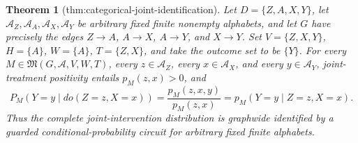 \documentclass{article}
\newtheorem{theorem}{Theorem}
\begin{document}
\begin{theorem}[thm:categorical-joint-identification]\label{thm:categorical-joint-identification}
Let \(D=\{Z,A,X,Y\}\), let \(\mathcal A_Z,\mathcal A_A,\mathcal A_X,\mathcal A_Y\) be arbitrary fixed finite nonempty alphabets, and let \(G\) have precisely the edges \(Z\to A\), \(A\to X\), \(A\to Y\), and \(X\to Y\).  Set \(V=\{Z,X,Y\}\), \(H=\{A\}\), \(W=\{A\}\), \(T=\{Z,X\}\), and take the outcome set to be \(\{Y\}\).  For every \(M\in\mathfrak M(G,\mathcal A,V,W,T)\), every \(z\in\mathcal A_Z\), every \(x\in\mathcal A_X\), and every \(y\in\mathcal A_Y\), joint-treatment positivity entails \(p_M(z,x)>0\), and
\[
 P_M(Y=y\mid do(Z=z,X=x))
 =\frac{p_M(z,x,y)}{p_M(z,x)}
 =p_M(Y=y\mid Z=z,X=x).
\]
Thus the complete joint-intervention distribution is graphwide identified by a guarded conditional-probability circuit for arbitrary fixed finite alphabets.
\end{theorem}
\end{document}
